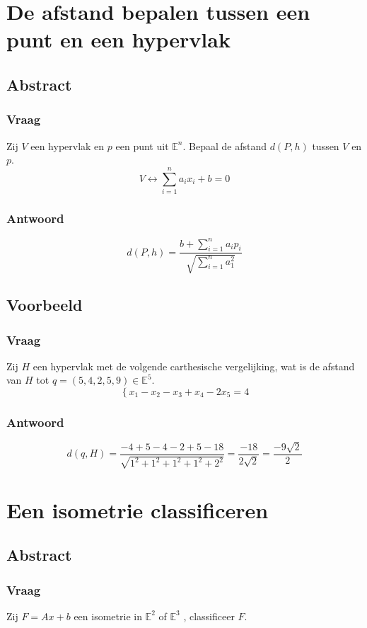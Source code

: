 \documentclass[main.tex]{subfiles}
\begin{document}
\newpage
\section{De afstand bepalen tussen een punt en een hypervlak }
\subsection*{Abstract}
\subsubsection*{Vraag}
\begin{center}
  Zij $V$ een hypervlak en $p$ een punt uit $\mathbb{E}^{n}$.
  Bepaal de afstand $d(P,h)$ tussen $V$ en $p$.
  \[ V \leftrightarrow   \sum_{i=1}^{n}a_{i}x_{i} + b = 0 \]
\end{center}
\subsubsection*{Antwoord}
\[d(P,h) = \frac{b+ \sum_{i=1}^{n}a_{i}p_{i}}{\sqrt{\sum_{i=1}^{n}a_{1}^{2}}}\]

\subsection*{Voorbeeld}
\subsubsection*{Vraag}
\begin{center}
  Zij $H$ een hypervlak met de volgende carthesische vergelijking, wat is de afstand van $H$ tot $q=(5,4,2,5,9) \in \mathbb{E}^{5}$.
  \[ \left\{ x_{1}-x_{2}-x_{3}+x_{4}-2x_{5} = 4  \right. \]
\end{center}
\subsubsection*{Antwoord}
\[ d(q,H) = \frac{-4 + 5-4-2+5-18}{\sqrt{1^{2}+1^{2}+1^{2}+1^{2}+2^{2}}} = \frac{-18}{2\sqrt{2}} = \frac{-9\sqrt{2}}{2}\]


\newpage
\section{Een isometrie classificeren}
\subsection*{Abstract}
\subsubsection*{Vraag}
\begin{center}
  Zij $F=Ax+b$ een isometrie in $\mathbb{E}^{2}$ of $\mathbb{E}^{3}$ , classificeer $F$.
\end{center}
\end{document}

